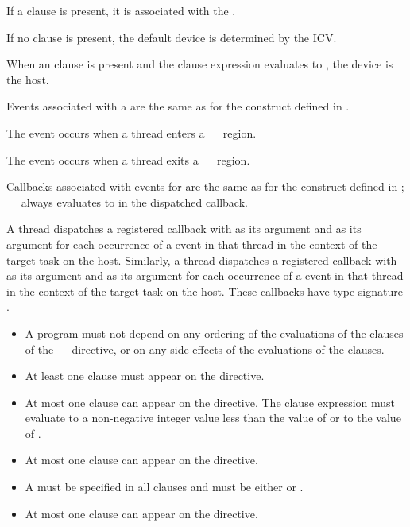If a  clause is present, it is associated with the .

If no  clause is present, the default device is determined by the 
 ICV.

When an  clause is present and the  clause expression 
evaluates to , the device is the host.

\events

Events associated with a  are the same as for the  
construct defined in .

The  event occurs when a thread enters a
~~ region.

The  event occurs when a thread exits a
~~ region.

\tools
Callbacks associated with events for  are the same as 
for the  construct defined in ;
\code{(}~\code{&}~ 
always evaluates to  in the dispatched callback.

A thread dispatches a registered  callback with
 as its  argument and
 as its  argument for each occurrence
of a  event in that thread in the context of the 
target task on the host. Similarly, a thread dispatches a registered 
 callback with  as its
 argument and  as its 
argument for each occurrence of a  event in that thread
in the context of the target task on the host. These callbacks have
type signature .

\restrictions
\begin{itemize}
\item A program must not depend on any ordering of the evaluations of the clauses 
      of the ~~ directive, or on any side 
      effects of the evaluations of the clauses.
\item At least one  clause must appear on the directive.
\item At most one  clause can appear on the directive. The 
       clause expression must evaluate to a non-negative integer 
      value less than the value of  or to the 
      value of .
\item At most one  clause can appear on the directive.
\item A  must be specified in all  clauses and must be 
      either  or .
\item At most one  clause can appear on the directive.
\end{itemize}

